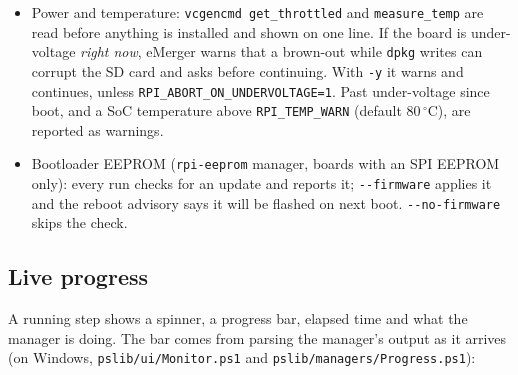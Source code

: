 \documentclass[11pt,a4paper]{article}
\begin{document}
\begin{itemize}
  \item Power and temperature: \texttt{vcgencmd get\_throttled}
        and \texttt{measure\_temp} are read before anything is installed
        and shown on one line. If the board is under-voltage \emph{right
        now}, eMerger warns that a brown-out while \texttt{dpkg} writes can
        corrupt the SD card and asks before continuing. With \texttt{-y} it
        warns and continues, unless \verb|RPI_ABORT_ON_UNDERVOLTAGE=1|.
        Past under-voltage since boot, and a SoC temperature above
        \verb|RPI_TEMP_WARN| (default 80\,$^\circ$C), are reported as warnings.
  \item Bootloader EEPROM (\texttt{rpi-eeprom} manager, boards with an
        SPI EEPROM only): every run checks for an update and reports it;
        \texttt{-{}-firmware} applies it and the reboot advisory says it
        will be flashed on next boot. \texttt{-{}-no-firmware} skips the check.
\end{itemize}

\subsection{Live progress}\label{sec:progress}
A running step shows a spinner, a progress bar, elapsed time and what
the manager is doing. The bar comes from parsing the manager's output as
it arrives (on Windows, \texttt{pslib/ui/Monitor.ps1} and
\texttt{pslib/managers/Progress.ps1}):
\end{document}
